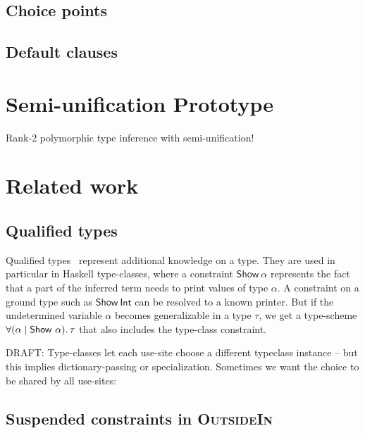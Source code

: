 \documentclass[acmsmall,screen,nonacm]{acmart}
\begin{document}
\subsection{Choice points}

\subsection{Default clauses}


\section{Semi-unification Prototype}

Rank-2 polymorphic type inference with semi-unification!


\section{Related work}
\label{sec:related-work}

\subsection{Qualified types}


Qualified types~\citep*{TODO} represent additional knowledge on a type. They
are used in particular in Haskell type-classes, where a constraint
$\mathsf{Show}~\alpha$ represents the fact that a part of the inferred term
needs to print values of type $\alpha$. A constraint on a ground type such
as $\mathsf{Show}~\mathsf{Int}$ can be resolved to a known printer. But if
the undetermined variable $\alpha$ becomes generalizable in a type $\tau$,
we get a type-scheme $\forall {(\alpha \mid \mathsf{Show}~\alpha)}.\,{\tau}$ that
also includes the type-class constraint.

DRAFT: Type-classes let each use-site choose a different typeclass instance
-- but this implies dictionary-passing or specialization. Sometimes we want
the choice to be shared by all use-sites:


\subsection{Suspended constraints in \textsc{OutsideIn}}
\end{document}
